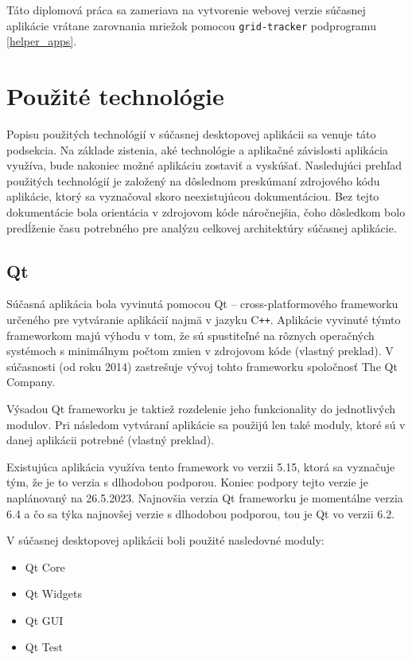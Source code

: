 Táto diplomová práca sa zameriava na vytvorenie webovej verzie súčasnej aplikácie vrátane zarovnania mriežok pomocou \texttt{grid-tracker} podprogramu \ref{helper_apps}.

\section {Použité technológie}

Popisu použitých technológií v súčasnej desktopovej aplikácii sa venuje táto podsekcia. Na základe zistenia, aké technológie a aplikačné závislosti aplikácia využíva, bude nakoniec možné aplikáciu zostaviť a vyskúšať. Nasledujúci prehľad použitých technológií je založený na dôslednom preskúmaní zdrojového kódu aplikácie, ktorý sa vyznačoval skoro neexistujúcou dokumentáciou. Bez tejto dokumentácie bola orientácia v zdrojovom kóde náročnejšia, čoho dôsledkom bolo predĺženie času potrebného pre analýzu celkovej architektúry súčasnej aplikácie.

\subsection {Qt}

Súčasná aplikácia bola vyvinutá pomocou Qt -- cross-platformového frameworku určeného pre vytváranie aplikácií najmä v jazyku C\texttt{++}. Aplikácie vyvinuté týmto frameworkom majú výhodu v tom, že sú spustiteľné na rôznych operačných systémoch s minimálnym počtom zmien v zdrojovom kóde \cite{qt_description} (vlastný preklad). V súčasnosti (od roku 2014) zastrešuje vývoj tohto frameworku spoločnosť The Qt Company.

Výsadou Qt frameworku je taktiež rozdelenie jeho funkcionality do jednotlivých modulov. Pri následom vytváraní aplikácie sa použijú len také moduly, ktoré sú v danej aplikácii potrebné \cite{qt_description} (vlastný preklad).

Existujúca aplikácia využíva tento framework vo verzii 5.15, ktorá sa vyznačuje tým, že je to verzia s dlhodobou podporou. Koniec podpory tejto verzie je naplánovaný na 26.5.2023. Najnovšia verzia Qt frameworku je momentálne verzia 6.4 a čo sa týka najnovšej verzie s dlhodobou podporou, tou je Qt vo verzii 6.2.

V súčasnej desktopovej aplikácii boli použité nasledovné moduly: 

\begin{itemize}
\item {Qt Core}
\item {Qt Widgets}
\item {Qt GUI}
\item {Qt Test}
\end{itemize}

